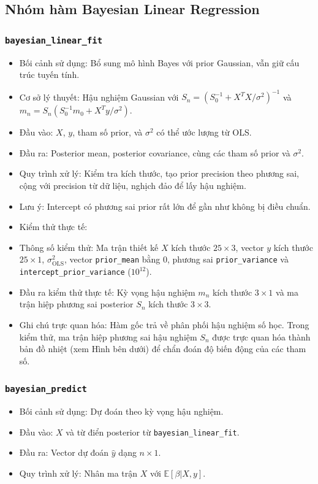 \documentclass[a4paper]{article}
\newcommand{\code}[1]{\colorbox{light-gray}{\texttt{#1}}}
\begin{document}
\subsection{Nhóm hàm Bayesian Linear Regression}

\subsubsection{\code{bayesian\_linear\_fit}}
\begin{itemize}[leftmargin=*]
    \item Bối cảnh sử dụng: Bổ sung mô hình Bayes với prior Gaussian, vẫn giữ cấu trúc tuyến tính.
    \item Cơ sở lý thuyết: Hậu nghiệm Gaussian với $S_n=(S_0^{-1}+X^T X/\sigma^2)^{-1}$ và $m_n=S_n(S_0^{-1}m_0+X^T y/\sigma^2)$.
    \item Đầu vào: $X$, $y$, tham số prior, và $\sigma^2$ có thể ước lượng từ OLS.
    \item Đầu ra: Posterior mean, posterior covariance, cùng các tham số prior và $\sigma^2$.
    \item Quy trình xử lý: Kiểm tra kích thước, tạo prior precision theo phương sai, cộng với precision từ dữ liệu, nghịch đảo để lấy hậu nghiệm.
    \item Lưu ý: Intercept có phương sai prior rất lớn để gần như không bị điều chuẩn.
    \item Kiểm thử thực tế:
    \item Thông số kiểm thử: Ma trận thiết kế $X$ kích thước $25 \times 3$, vector $y$ kích thước $25 \times 1$, $\sigma^2_{\text{OLS}}$, vector \texttt{prior\_mean} bằng 0, phương sai \texttt{prior\_variance} và \texttt{intercept\_prior\_variance} ($10^{12}$).
    \item Đầu ra kiểm thử thực tế: Kỳ vọng hậu nghiệm $m_n$ kích thước $3 \times 1$ và ma trận hiệp phương sai posterior $S_n$ kích thước $3 \times 3$.
    \item Ghi chú trực quan hóa: Hàm gốc trả về phân phối hậu nghiệm số học. Trong kiểm thử, ma trận hiệp phương sai hậu nghiệm $S_n$ được trực quan hóa thành bản đồ nhiệt (xem Hình bên dưới) để chẩn đoán độ biến động của các tham số.
\end{itemize}

\subsubsection{\code{bayesian\_predict}}
\begin{itemize}[leftmargin=*]
    \item Bối cảnh sử dụng: Dự đoán theo kỳ vọng hậu nghiệm.
    \item Đầu vào: $X$ và từ điển posterior từ \texttt{bayesian\_linear\_fit}.
    \item Đầu ra: Vector dự đoán $\hat{y}$ dạng $n\times1$.
    \item Quy trình xử lý: Nhân ma trận $X$ với $\mathbb{E}[\beta|X,y]$.
\end{itemize}
\end{document}

